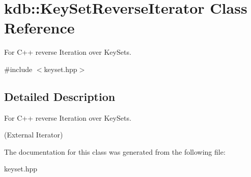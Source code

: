 \hypertarget{classkdb_1_1KeySetReverseIterator}{\section{kdb\-:\-:Key\-Set\-Reverse\-Iterator Class Reference}
\label{classkdb_1_1KeySetReverseIterator}
}


For C++ reverse Iteration over Key\-Sets.  




{\ttfamily \#include $<$keyset.\-hpp$>$}



\subsection{Detailed Description}
For C++ reverse Iteration over Key\-Sets. 

(External Iterator) 

The documentation for this class was generated from the following file\-:\begin{DoxyCompactItemize}
\item 
keyset.\-hpp\end{DoxyCompactItemize}

